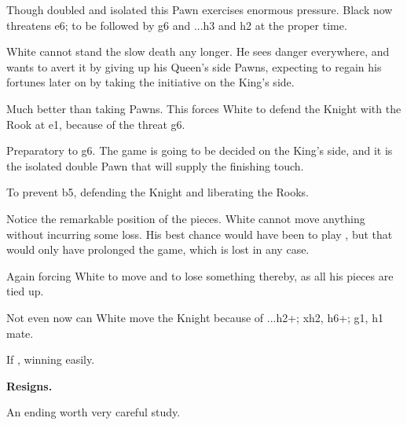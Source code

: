 \documentclass[10pt,twoside]{article}
\begin{document}

Though doubled and isolated this Pawn exercises enormous pressure. Black now threatens \figR e6; to be followed by \figR g6 and ...h3 and h2 at the proper time.


White cannot stand the slow death any longer. He sees danger everywhere, and wants to avert it by giving up his Queen's side Pawns, expecting to regain his fortunes later on by taking the initiative on the King's side.


Much better than taking Pawns. This forces White to defend the Knight with the Rook at e1, because of the threat \figR g6.


Preparatory to \figR g6. The game is going to be decided on the King's side, and it is the isolated double Pawn that will supply the finishing touch.


To prevent b5, defending the Knight and liberating the Rooks.


\board

Notice the remarkable position of the pieces. White cannot move anything without incurring some loss. His best chance would have been to play , but that would only have prolonged the game, which is lost in any case.


Again forcing White to move and to lose something thereby, as all his pieces are tied up.

\board


Not even now can White move the Knight because of ...h2+; \figK xh2, \figR h6+; \figK g1, \figR h1 mate.


If , winning easily.


\noindent\textbf{Resigns.}

An ending worth very careful study.
\end{document}
